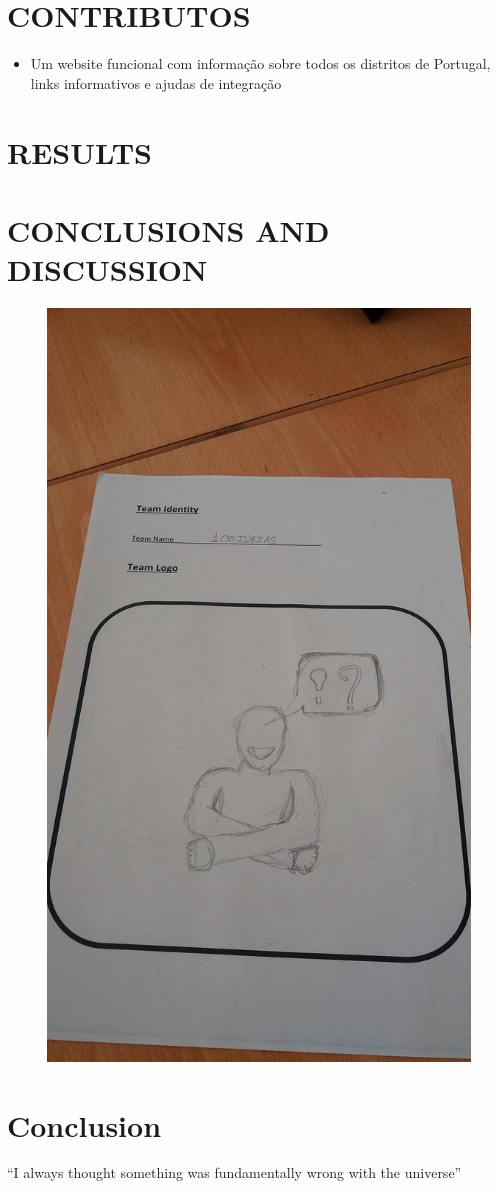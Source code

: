 \documentclass{article}
\begin{document}
\section{CONTRIBUTOS}
\begin{itemize}
\item Um website funcional com informação sobre todos os distritos
de Portugal, links informativos e ajudas de integração
\end{itemize}
\section{RESULTS}
 
\section{CONCLUSIONS AND DISCUSSION}




\begin{figure}[h!]
\centering
\includegraphics[scale=0.5]{logo.jpg}
\caption{}
\label{fig:univerise}
\end{figure}

\section{Conclusion}
``I always thought something was fundamentally wrong with the universe'' \citep{adams1995hitchhiker}



\end{document}
